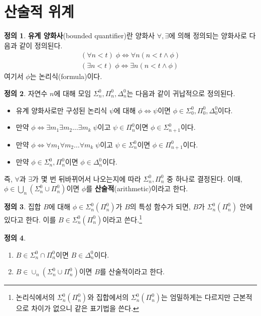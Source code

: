 \documentclass[b5paper, 11pt]{book}
\theoremstyle{definition}
\newtheorem{defn}{정의}[chapter]
\begin{document}
\section{산술적 위계}
\begin{defn}
    \textbf{유계 양화사}(bounded quantifier)란 양화사 $\forall, \exists$에 의해
    정의되는 양화사로 다음과 같이 정의된다. 
    \begin{align*}
        (\forall n < t )\; \phi \Leftrightarrow \forall n (n < t \wedge \phi) \\
        (\exists n < t )\; \phi \Leftrightarrow \exists n (n < t \wedge \phi)
    \end{align*}
    여기서 $\phi$는 논리식(formula)이다. 
\end{defn}
\begin{defn}
    자연수 $n$에 대해 모임 $\Sigma_n^0, \Pi_n^0, \Delta_n^0$는 다음과 같이 귀납적으로 정의된다.
    \begin{itemize}
        \item 유계 양화사로만 구성된 논리식 $\psi$에 대해 $\phi \Leftrightarrow \psi$이면 $\phi \in 
        \Sigma_0^0, \Pi_0^0, \Delta_0^0$이다. 
        \item 만약 $\phi \Leftrightarrow \exists m_1 \exists m_2 \ldots \exists m_k \; \psi$이고
        $\psi \in \Pi_n^0$이면 $\phi \in \Sigma_{n+1}^0$이다.  
        \item 만약 $\phi \Leftrightarrow \forall m_1 \forall m_2 \ldots \forall m_k \; \psi$이고
        $\psi \in \Sigma_n^0$이면 $\phi \in \Pi_{n+1}^0$이다.  
        \item 만약 $\phi \in \Sigma_n^0, \Pi_n^0$이면 $\phi \in \Delta_n^0$이다.
    \end{itemize}
    즉, $\forall $과 $\exists$가 몇 번 뒤바뀌어서 나오는지에 따라 $\Sigma_n^0, \Pi_n^0$ 중 하나로 결정된다. 이때, $\phi \in \bigcup_n (\Sigma_n^0 \cup \Pi_n^0 )$이면 $\phi$를 \textbf{산술적}(arithmetic)이라고 한다.
\end{defn}
\begin{defn}
    집합 $B$에 대해 $\phi \in \Sigma_n^0 (\Pi_n^0)$가 $B$의 특성 함수가 되면, $B$가 $\Sigma_n^0 (\Pi_n^0)$ 안에 있다고 한다. 이를 $B \in \Sigma_n^0 (\Pi_n^0)$이라고 쓴다.\footnote{논리식에서의 $\Sigma_n^0 (\Pi_n^0)$와 집합에서의 $\Sigma_n^0 (\Pi_n^0)$는 엄밀하게는 다르지만 근본적으로 차이가 없으니 같은 표기법을 쓴다.}
\end{defn}
\begin{defn}
    \begin{enumerate}
        \item $B \in \Sigma_n^0 \cap \Pi_n^0$이면 $B \in \Delta_n^0$이다.
        \item $B \in \cup_n (\Sigma_n^0 \cup \Pi_n^0)$이면 $B$를 산술적이라고 한다.
    \end{enumerate}
\end{defn}
\end{document}
